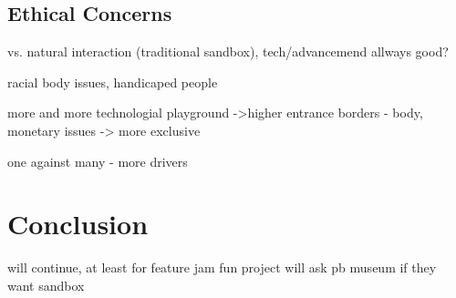 \documentclass[12pt,a4paper,twoside,titlepage,headsepline,numbers=noenddot,listof=totoc,index=totoc,bibliography=totoc]{scrartcl}
\theoremstyle{break}
\begin{document}
\subsection{Ethical Concerns}
vs. natural interaction (traditional sandbox), tech/advancemend allways good?

racial body issues, handicaped people

more and more technologial playground ->higher entrance borders - body, monetary issues -> more exclusive 

one against many - more drivers

\section{Conclusion}

will continue, at least for feature jam
fun project
will ask pb museum if they want sandbox


\end{document}
